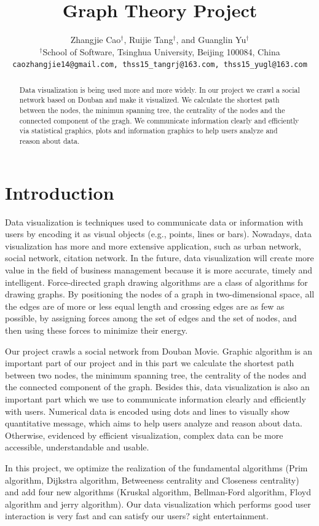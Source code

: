\documentclass{article}
\title{Graph Theory Project}
\author{
Zhangjie Cao$^\dag$, Ruijie Tang$^\dag$, and Guanglin Yu$^\dag$\\
$^\dag$School of Software, Tsinghua University, Beijing 100084, China\\
\texttt{caozhangjie14@gmail.com, thss15\_tangrj@163.com, thss15\_yugl@163.com}\\
}
\begin{document}
\maketitle

\begin{abstract}
Data visualization is being used more and more widely. In our project we crawl a social network based on Douban and make it visualized. We calculate the shortest path between the nodes, the minimun spanning tree, the centrality of the nodes and the connected component of the gragh. We communicate information clearly and efficiently via statistical graphics, plots and information graphics to help users analyze and reason about data. 
\end{abstract}

\section{Introduction}
Data visualization is techniques used to communicate data or information with users by encoding it as visual objects (e.g., points, lines or bars). Nowadays, data visualization has more and more extensive application, such as urban network, social network, citation network. In the future, data visualization will create more value in the field of business management because it is more accurate, timely and intelligent. Force-directed graph drawing algorithms are a class of algorithms for drawing graphs. By positioning the nodes of a graph in two-dimensional space, all the edges are of more or less equal length and crossing edges are as few as possible, by assigning forces among the set of edges and the set of nodes, and then using these forces to minimize their energy.

Our project crawls a social network from Douban Movie. Graphic algorithm is an important part of our project and in this part we calculate the shortest path between two nodes, the minimum spanning tree, the centrality of the nodes and the connected component of the graph. Besides this, data visualization is also an important part which we use to communicate information clearly and efficiently with users. Numerical data is encoded using dots and lines to visually show quantitative message, which aims to help users analyze and reason about data. Otherwise, evidenced by efficient visualization, complex data can be more accessible, understandable and usable.

In this project, we optimize the realization of the fundamental algorithms (Prim algorithm, Dijkstra algorithm, Betweeness centrality and Closeness centrality) and add four new algorithms (Kruskal algorithm, Bellman-Ford algorithm, Floyd algorithm and jerry algorithm). Our data visualization which performs good user interaction is very fast and can satisfy our users? sight entertainment.
\end{document}
